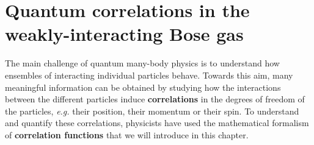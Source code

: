 
\chapter{Quantum correlations in the weakly-interacting Bose gas}

\label{sec:chapter_1}

\fancyhead[LO]{\rightmark} %
\fancyhead[RE]{\leftmark}







The main challenge of quantum many-body physics is to understand how ensembles of interacting individual particles behave. Towards this aim, many meaningful information can be obtained by studying how the interactions between the different particles induce \textbf{correlations} in the degrees of freedom of the particles, {\it e.g.} their position, their momentum or their spin. To understand and quantify these correlations, physicists have used the mathematical formalism of \textbf{correlation functions} that we will introduce in this chapter. 

